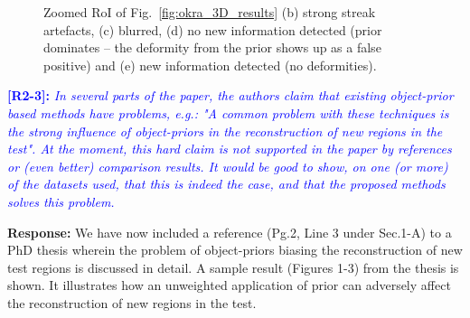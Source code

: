 \documentclass[11pt]{article}
\begin{document}
\begin{figure}[p]
\hfill
{}
\caption[Zoomed results of Okra dataset]{Zoomed RoI of Fig.~\ref{fig:okra_3D_results} (b) strong streak artefacts, (c) blurred, (d) no new  information detected (prior dominates -- the deformity from the prior
  shows up as a false positive) and (e) new information detected (no deformities).}
\label{fig:okra_zoomed_3D_results}
\end{figure}

\vspace{0.5cm}\textcolor{blue}{\textbf{[R2-3]:} \textit{In several parts of the
    paper, the authors claim that existing object-prior based methods
    have problems, e.g.: "A common problem with these techniques is
    the strong influence of object-priors in the reconstruction of new
    regions in the test". At the moment, this hard claim is not
    supported in the paper by references or (even better) comparison
    results. It would be good to show, on one (or more) of the
    datasets used, that this is indeed the case, and that the proposed
    methods solves this problem.}}

\textbf{Response:} We have now included a reference (Pg.2, Line 3
under Sec.1-A) to a PhD thesis wherein the problem of object-priors
biasing the reconstruction of new test regions is discussed in detail.
A sample result (Figures 1-3) from the thesis is shown. It
illustrates how an unweighted application of prior can adversely
affect the reconstruction of new regions in the test.
\end{document}
